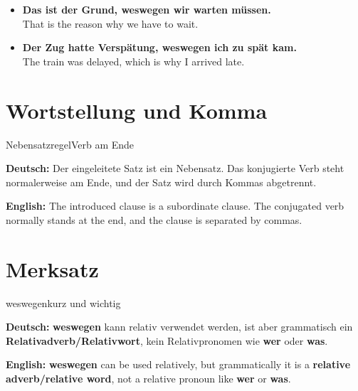 \documentclass[a4paper,11pt]{article}
\newcommand{\GermanText}[1]{\textbf{Deutsch: }#1\par}
\newcommand{\EnglishText}[1]{{\small\color{SoftGray}\textbf{English: }#1\par}}
\newcommand{\ExampleItem}[2]{\item \textbf{#1}\\{\small\color{SoftGray}#2}}
\begin{document}
\begin{exbox}

\begin{itemize}

\ExampleItem{Das ist der Grund, weswegen wir warten müssen.}{That is the reason why we have to wait.}

\ExampleItem{Der Zug hatte Verspätung, weswegen ich zu spät kam.}{The train was delayed, which is why I arrived late.}

\end{itemize}

\end{exbox}

\section{Wortstellung und Komma}

\begin{grammarentry}{Nebensatzregel}{Verb am Ende}

\GermanText{Der eingeleitete Satz ist ein Nebensatz. Das konjugierte Verb steht normalerweise am Ende, und der Satz wird durch Kommas abgetrennt.}

\EnglishText{The introduced clause is a subordinate clause. The conjugated verb normally stands at the end, and the clause is separated by commas.}

\end{grammarentry}

\section{Merksatz}

\begin{grammarentry}{weswegen}{kurz und wichtig}

\GermanText{\textbf{weswegen} kann relativ verwendet werden, ist aber grammatisch ein \textbf{Relativadverb/Relativwort}, kein Relativpronomen wie \textbf{wer} oder \textbf{was}.}

\EnglishText{\textbf{weswegen} can be used relatively, but grammatically it is a \textbf{relative adverb/relative word}, not a relative pronoun like \textbf{wer} or \textbf{was}.}

\end{grammarentry}
\end{document}
